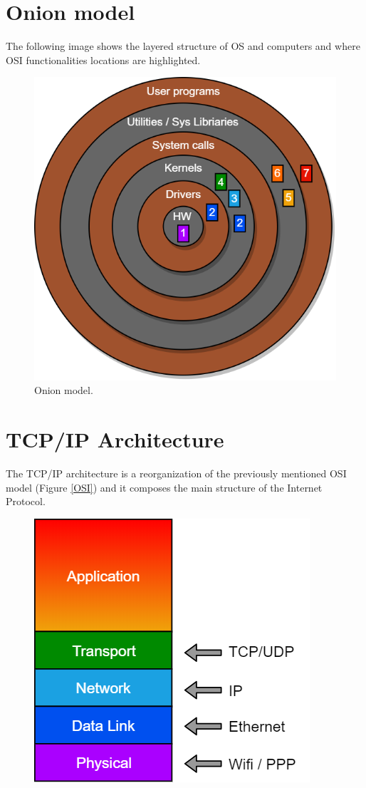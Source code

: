 \section{Onion model}\label{onion_section}
The following image shows the layered structure of OS and computers and where OSI functionalities locations are highlighted. 
\begin{figure}[h]
\centering
\includegraphics[scale=0.5]{Images/OSI/onion}
\caption{\footnotesize{Onion model.}}\label{onion}
\end{figure}

\section{TCP/IP Architecture}
The TCP/IP architecture is a reorganization of the previously mentioned OSI model (Figure \ref{OSI}) and it composes the main structure of the Internet Protocol. 
\begin{figure}[h]
\centering
\includegraphics[scale=0.5]{Images/OSI/tcp_ip}
\end{figure}

